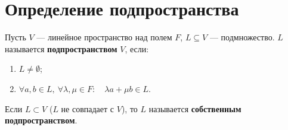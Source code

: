 \section{Определение подпространства}

\begin{definition}[Подпространство]
Пусть $V$ --- линейное пространство над полем $F$, $L \subseteq V$ --- подмножество. $L$ называется \textbf{подпространством} $V$, если:
\begin{enumerate}
    \item $L \neq \emptyset$;
    \item $\forall a, b \in L,\ \forall \lambda, \mu \in F: \quad \lambda a + \mu b \in L$.
\end{enumerate}
Если $L \subset V$ ($L$ не совпадает с $V$), то $L$ называется \textbf{собственным подпространством}.
\end{definition}
